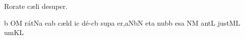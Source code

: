 %


\beginhymn Rorate c\ae li desuper.

\Internote
\nosolesmescustos
\initiumgregorianum
\znotes\fissum{1pt}\bmolle b\en
{}%
\sgn {}O{}\punctum M\egn
\sgn r{\'a}{t}\pes Na\egn
\sgn {}e{}\punctum a\augmentum b\egn
\spatium
\begingroup
\bgenerale
\sgn c{\ae}{l}\engl{}\punctum d\egn
\sgn {}i{}\punctum c\egn
\spatium
\sgn d{\'e}{-}\clivis cb\egn
\sgn su{p}\punctum a\egn
\sgn {}e{r,}\clivis aN\augmentumduplex bN\egn
\spatium
\divisiominor
\spatium
\sgn {}et\punctum a\egn
\spatium
\sgn n{u}b\punctum b\egn
\sgn {}es\punctum a\egn
\spatium
{}\clivis NM\egn
\sgn {}a{nt}\punctum L\egn
\spatium
\sgn j{u}{st}\clivis ML\egn
\sgn {}um\punctum K\augmentum L\egn
\spatium
\endgroup
\Finisgregoriana

\bigskip


